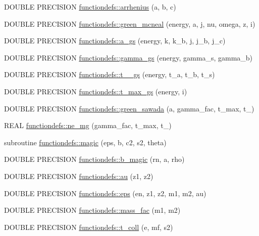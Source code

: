 \begin{DoxyCompactItemize}
\item 
DOUBLE PRECISION \hyperlink{namespacefunctiondefs_ae9b1c95ccb465d122918ab89da45aed7}{functiondefs::arrhenius} (a, b, c)
\item 
DOUBLE PRECISION \hyperlink{namespacefunctiondefs_ad75756612cb12ba4983414cdc520f6a1}{functiondefs::green\_\-mcneal} (energy, a, j, nu, omega, z, i)
\item 
DOUBLE PRECISION \hyperlink{namespacefunctiondefs_a9cd4ed9f980bd43386e7de1e3e35c79c}{functiondefs::a\_\-gs} (energy, k, k\_\-b, j, j\_\-b, j\_\-c)
\item 
DOUBLE PRECISION \hyperlink{namespacefunctiondefs_adae12a3980d4e2bd5fe6277c91988474}{functiondefs::gamma\_\-gs} (energy, gamma\_\-s, gamma\_\-b)
\item 
DOUBLE PRECISION \hyperlink{namespacefunctiondefs_a5e1c4c25a7352f149e1f18854c37930f}{functiondefs::t\_\_\-gs} (energy, t\_\-a, t\_\-b, t\_\-s)
\item 
DOUBLE PRECISION \hyperlink{namespacefunctiondefs_a7beb6f6af6e15afda97da88dde407655}{functiondefs::t\_\-max\_\-gs} (energy, i)
\item 
DOUBLE PRECISION \hyperlink{namespacefunctiondefs_a64cc5970914d70f20e127be3722f11bb}{functiondefs::green\_\-sawada} (a, gamma\_\-fac, t\_\-max, t\_)
\item 
REAL \hyperlink{namespacefunctiondefs_abb5f2d51b3f8b637e0d17ad8c21db948}{functiondefs::ne\_\-mg} (gamma\_\-fac, t\_\-max, t\_)
\item 
subroutine \hyperlink{namespacefunctiondefs_a93c18b11591055e1e1275c6dc7b2ab26}{functiondefs::magic} (eps, b, c2, s2, theta)
\item 
DOUBLE PRECISION \hyperlink{namespacefunctiondefs_a34160b04b7880953967f273645a835c5}{functiondefs::b\_\-magic} (rn, a, rho)
\item 
DOUBLE PRECISION \hyperlink{namespacefunctiondefs_abf4df469161d4f4092a1a538a20ebf1d}{functiondefs::au} (z1, z2)
\item 
DOUBLE PRECISION \hyperlink{namespacefunctiondefs_ac20c2b09d0408eb23b226af7f8f7361a}{functiondefs::eps} (en, z1, z2, m1, m2, au)
\item 
DOUBLE PRECISION \hyperlink{namespacefunctiondefs_aa92057c8da0a7ce374166fed435ea54f}{functiondefs::mass\_\-fac} (m1, m2)
\item 
DOUBLE PRECISION \hyperlink{namespacefunctiondefs_a529a6bcbb0305c32f0275aa85d4303e8}{functiondefs::t\_\-coll} (e, mf, s2)
\item 

\end{DoxyCompactItemize}
